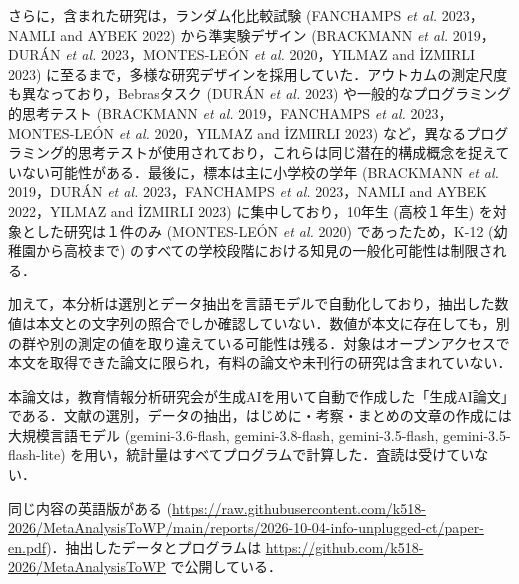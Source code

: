 \documentclass[
  lualatex, ja=standard, paper={182mm,257mm}, twocolumn, fontsize=8.5pt, baselineskip=13.5pt,
  line_length=24zw, column_gap=6.1mm, number_of_lines=45, head_space=24.5mm, gutter=16.25mm
]{jlreq}
\newcommand{\chapspaced}[1]{\par\vspace{13.5pt}\needspace{4\baselineskip}{\centering\gtfamily\bfseries #1\par}\nopagebreak}
\begin{document}
さらに，含まれた研究は，ランダム化比較試験 (FANCHAMPS \textit{et al.} 2023，NAMLI and AYBEK 2022) から準実験デザイン (BRACKMANN \textit{et al.} 2019，DURÁN \textit{et al.} 2023，MONTES-LEÓN \textit{et al.} 2020，YILMAZ and İZMIRLI 2023) に至るまで，多様な研究デザインを採用していた．アウトカムの測定尺度も異なっており，Bebrasタスク (DURÁN \textit{et al.} 2023) や一般的なプログラミング的思考テスト (BRACKMANN \textit{et al.} 2019，FANCHAMPS \textit{et al.} 2023，MONTES-LEÓN \textit{et al.} 2020，YILMAZ and İZMIRLI 2023) など，異なるプログラミング的思考テストが使用されており，これらは同じ潜在的構成概念を捉えていない可能性がある．最後に，標本は主に小学校の学年 (BRACKMANN \textit{et al.} 2019，DURÁN \textit{et al.} 2023，FANCHAMPS \textit{et al.} 2023，NAMLI and AYBEK 2022，YILMAZ and İZMIRLI 2023) に集中しており，10年生 (高校１年生) を対象とした研究は１件のみ (MONTES-LEÓN \textit{et al.} 2020) であったため，K-12 (幼稚園から高校まで) のすべての学校段階における知見の一般化可能性は制限される．

加えて，本分析は選別とデータ抽出を言語モデルで自動化しており，抽出した数値は本文との文字列の照合でしか確認していない．数値が本文に存在しても，別の群や別の測定の値を取り違えている可能性は残る．対象はオープンアクセスで本文を取得できた論文に限られ，有料の論文や未刊行の研究は含まれていない．

\chapspaced{付\hspace{1\zw}記}
本論文は，教育情報分析研究会が生成AIを用いて自動で作成した「生成AI論文」である．文献の選別，データの抽出，はじめに・考察・まとめの文章の作成には大規模言語モデル (gemini-3.6-flash, gemini-3.8-flash, gemini-3.5-flash, gemini-3.5-flash-lite) を用い，統計量はすべてプログラムで計算した．査読は受けていない．

同じ内容の英語版がある (\url{https://raw.githubusercontent.com/k518-2026/MetaAnalysisToWP/main/reports/2026-10-04-info-unplugged-ct/paper-en.pdf})．抽出したデータとプログラムは \url{https://github.com/k518-2026/MetaAnalysisToWP} で公開している．
\end{document}
